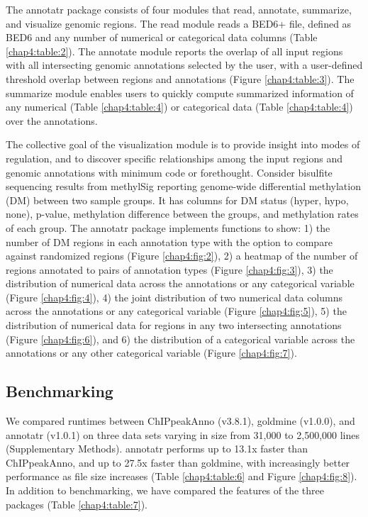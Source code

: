 The annotatr package consists of four modules that read, annotate, summarize, and visualize genomic regions. The read module reads a BED6+ file, defined as BED6 and any number of numerical or categorical data columns (Table \ref{chap4:table:2}). The annotate module reports the overlap of all input regions with all intersecting genomic annotations selected by the user, with a user-defined threshold overlap between regions and annotations (Figure \ref{chap4:table:3}). The summarize module enables users to quickly compute summarized information of any numerical (Table \ref{chap4:table:4}) or categorical data (Table \ref{chap4:table:4}) over the annotations.

The collective goal of the visualization module is to provide insight into modes of regulation, and to discover specific relationships among the input regions and genomic annotations with minimum code or forethought. Consider bisulfite sequencing results from methylSig \cite{Park:2014ho} reporting genome-wide differential methylation (DM) between two sample groups. It has columns for DM status (hyper, hypo, none), p-value, methylation difference between the groups, and methylation rates of each group. The annotatr package implements functions to show: 1) the number of DM regions in each annotation type with the option to compare against randomized regions (Figure \ref{chap4:fig:2}), 2) a heatmap of the number of regions annotated to pairs of annotation types (Figure \ref{chap4:fig:3}), 3) the distribution of numerical data across the annotations or any categorical variable (Figure \ref{chap4:fig:4}), 4) the joint distribution of two numerical data columns across the annotations or any categorical variable (Figure \ref{chap4:fig:5}), 5) the distribution of numerical data for regions in any two intersecting annotations (Figure \ref{chap4:fig:6}), and 6) the distribution of a categorical variable across the annotations or any other categorical variable (Figure \ref{chap4:fig:7}).

\subsection{Benchmarking}
\label{annotatr_results_benchmarking}

We compared runtimes between ChIPpeakAnno (v3.8.1), goldmine (v1.0.0), and  annotatr (v1.0.1) on three data sets varying in size from 31,000 to 2,500,000 lines (Supplementary Methods). annotatr performs up to 13.1x faster than ChIPpeakAnno, and up to 27.5x faster than goldmine, with increasingly better performance as file size increases (Table \ref{chap4:table:6} and Figure \ref{chap4:fig:8}). In addition to benchmarking, we have compared the features of the three packages (Table \ref{chap4:table:7}).

